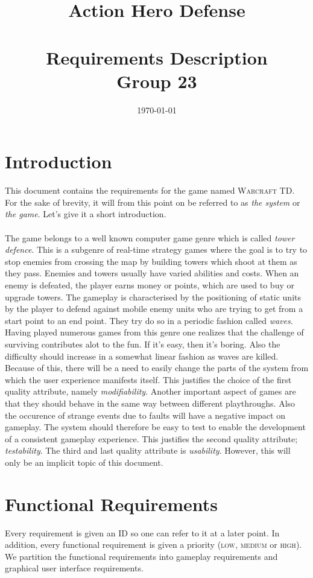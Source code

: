 \documentclass[11pt,a4paper]{article}
\title{\textbf{Action Hero Defense}\\\HRule\\Requirements Description\\ Group 23}
\author{\and Håvard Geithus
	\and  Sondre Løberg Sæter 
	\and Nicolai Meltveit 
	\and Hallvard Andreas Eriksen 
	\and  Håkon Drolsum Røkenes}
\date{\today}
\begin{document}


\newpage
\tableofcontents
\newpage

\section{Introduction}
This document contains the requirements for the game named \textsc{Warcraft TD}. For the sake of brevity, it will from this point on be referred to as \textit{the system} or \textit{the game}. Let's give it a short introduction. \\\\ The game belongs to a well known computer game genre which is called \textit{tower defence}. This is a subgenre of real-time strategy games where the goal is to try to stop enemies from crossing the map by building towers which shoot at them as they pass. Enemies and towers usually have varied abilities and costs. When an enemy is defeated, the player earns money or points, which are used to buy or upgrade towers. The gameplay is characterised by the positioning of static units by the player to defend against mobile enemy units who are trying to get from a start point to an end point. They try do so in a periodic fashion called \textit{waves}. Having played numerous games from this genre one realizes that the challenge of surviving contributes alot to the fun. If it's easy, then it's boring. Also the difficulty should increase in a somewhat linear fashion as waves are killed. Because of this, there will be a need to easily change the parts of the system from which the user experience manifests itself. This justifies the choice of the first quality attribute, namely \textit{modifiability}. Another important aspect of games are that they should behave in the same way between different playthroughs. Also the occurence of strange events due to faults will have a negative impact on gameplay. The system should therefore be easy to test to enable the development of a consistent gameplay experience. This justifies the second quality attribute; \textit{testability}. The third and last quality attribute is \textit{usability}. However, this will only be an implicit topic of this document.

\section{Functional Requirements}
Every requirement is given an ID so one can refer to it at a later point. In addition, every functional requirement is given a priority (\textsc{low}, \textsc{medium} or \textsc{high}). We partition the functional requirements into gameplay requirements and graphical user interface requirements.
\end{document}
